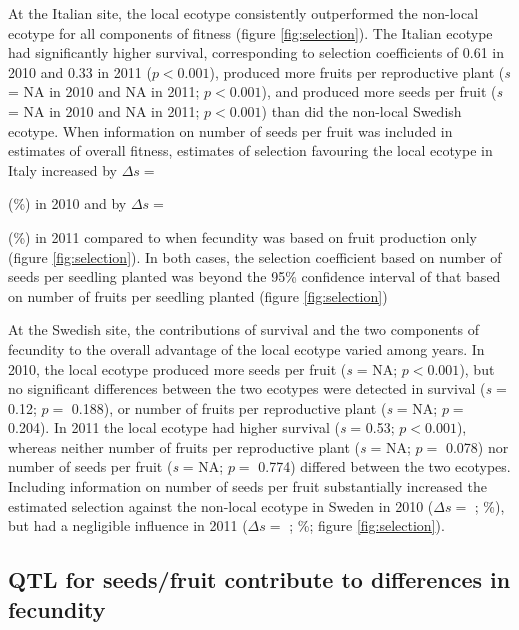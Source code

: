 \documentclass[]{article}
\begin{document}
At the Italian site, the local ecotype consistently outperformed the non-local ecotype for all components of fitness (figure \ref{fig:selection}).
The Italian ecotype had significantly higher survival, corresponding to selection coefficients of
0.61 in 2010 and
0.33 in 2011
(\(p < 0.001\)),
produced more fruits per reproductive plant
(\emph{s} =
NA in 2010 and
NA in 2011;
\(p < 0.001\)),
and produced more seeds per fruit
(\emph{s} =
NA in 2010 and
NA in 2011;
\(p < 0.001\))
than did the non-local Swedish ecotype.
When information on number of seeds per fruit was included in estimates of overall fitness, estimates of selection favouring the local ecotype in Italy increased by
\(\Delta s=\)

(\%)
in 2010 and by \(\Delta s=\)

(\%)
in 2011 compared to when fecundity was based on fruit production only (figure \ref{fig:selection}).
In both cases, the selection coefficient based on number of seeds per seedling planted was beyond the 95\% confidence interval of that based on number of fruits per seedling planted (figure \ref{fig:selection})

At the Swedish site, the contributions of survival and the two components of fecundity to the overall advantage of the local ecotype varied among years.
In 2010, the local ecotype produced more seeds per fruit
(\emph{s} = NA;
\(p < 0.001\)),
but no significant differences between the two ecotypes were detected in survival
(\emph{s} = 0.12;
\(p=\) 0.188),
or number of fruits per reproductive plant
(\emph{s} = NA;
\(p=\) 0.204).
In 2011 the local ecotype had higher survival
(\emph{s} = 0.53;
\(p < 0.001\)),
whereas neither number of fruits per reproductive plant
(\emph{s} = NA;
\(p=\) 0.078)
nor number of seeds per fruit
(\emph{s} = NA;
\(p=\) 0.774)
differed between the two ecotypes.
Including information on number of seeds per fruit substantially increased the estimated selection against the non-local ecotype in Sweden in 2010
(\(\Delta s=\)
;
\%),
but had a negligible influence in 2011
(\(\Delta s=\)
;
\%;
figure \ref{fig:selection}).

\hypertarget{qtl-for-seedsfruit-contribute-to-differences-in-fecundity}{%
\subsection{QTL for seeds/fruit contribute to differences in fecundity}\label{qtl-for-seedsfruit-contribute-to-differences-in-fecundity}}
\end{document}
